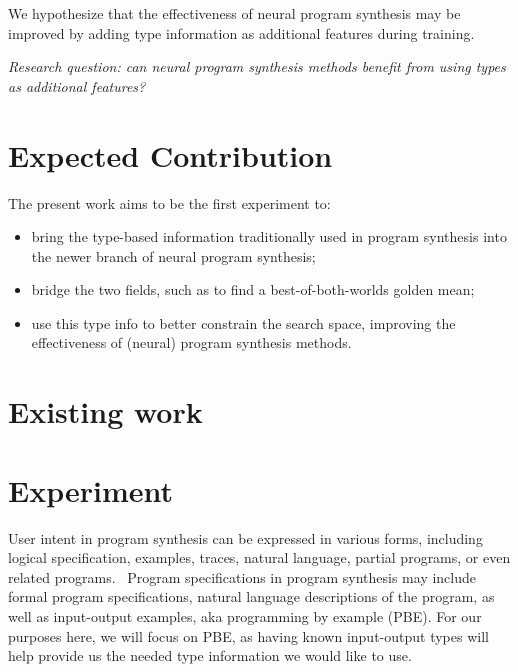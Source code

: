 \documentclass{article}
\begin{document}
We hypothesize that the effectiveness of neural program synthesis may be improved by 
adding type information as additional features during training.



\emph{Research question: can neural program synthesis methods benefit from using types as additional features?}

\section{Expected Contribution}

The present work aims to be the first experiment to:
\begin{itemize}
    \item bring the type-based information traditionally used in program synthesis into the newer branch of neural program synthesis;
    \item bridge the two fields, such as to find a best-of-both-worlds golden mean;
    \item use this type info to better constrain the search space, improving the effectiveness of (neural) program synthesis methods. 
\end{itemize}

\section{Existing work}



\section{Experiment}

User intent in program synthesis can be expressed in various forms, including logical specification, examples, traces, natural language, partial programs, or even related programs.~\citep{gulwani2017program}
Program specifications in program synthesis may include formal program specifications, natural language descriptions of the program, as well as input-output examples, aka programming by example (PBE).
For our purposes here, we will focus on PBE, as having known input-output types will help provide us the needed type information we would like to use.
\end{document}
